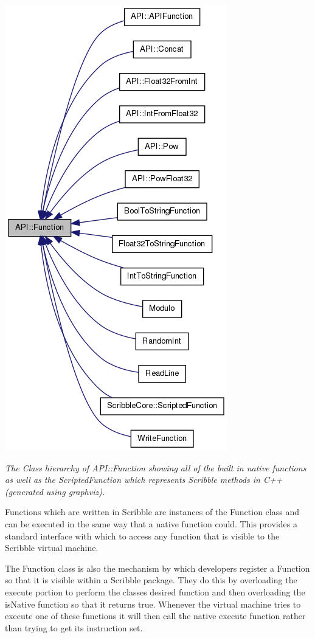 \documentclass[]{final_report}
\begin{document}
\begin{center}
\includegraphics[scale=0.6]{"function_class_diagram"}
\end{center}

\emph{The Class hierarchy of API::Function showing all of the built in native functions as well as the ScriptedFunction which represents Scribble methods in C++ (generated using graphviz).}

Functions which are written in Scribble are instances of the Function class and can be executed in the same way that a native function could. This provides a standard interface with which to access any function that is visible to the Scribble virtual machine.

The Function class is also the mechanism by which developers register a Function so that it is visible within a Scribble package. They do this by overloading the execute portion to perform the classes desired function and then overloading the isNative function so that it returns true. Whenever the virtual machine tries to execute one of these functions it will then call the native execute function rather than trying to get its instruction set.
\end{document}
